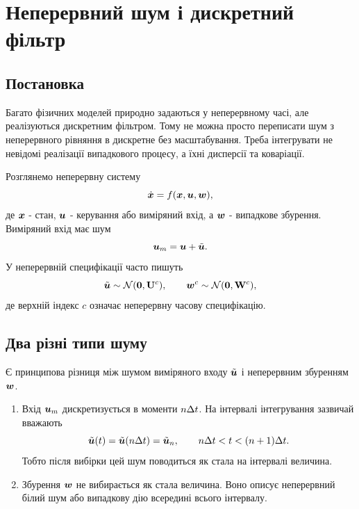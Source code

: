 \chapter{Неперервний шум і дискретний фільтр}


\section{Постановка}

Багато фізичних моделей природно задаються у неперервному часі, але реалізуються дискретним фільтром. Тому не можна просто переписати шум з неперервного рівняння в дискретне без масштабування. Треба інтегрувати не невідомі реалізації випадкового процесу, а їхні дисперсії та коваріації.

Розглянемо неперервну систему
\begin{equation}\label{eq:cont_sys_noise_session02}
\dot{\bm{x}}=f(\bm{x},\bm{u},\bm{w}),
\end{equation}
де $\bm{x}$ - стан, $\bm{u}$ - керування або виміряний вхід, а $\bm{w}$ - випадкове збурення. Виміряний вхід має шум
\begin{equation}
\bm{u}_m=\bm{u}+\tilde{\bm{u}}.
\end{equation}
У неперервній специфікації часто пишуть
\begin{equation}
\tilde{\bm{u}}\sim\mathcal{N}(\bm{0},\mathbf{U}^{c}),
\qquad
\bm{w}^{c}\sim\mathcal{N}(\bm{0},\mathbf{W}^{c}),
\end{equation}
де верхній індекс $c$ означає неперервну часову специфікацію.

\section{Два різні типи шуму}

Є принципова різниця між шумом виміряного входу $\tilde{\bm{u}}$ і неперервним збуренням $\bm{w}$.

\begin{enumerate}[leftmargin=2em]
\item Вхід $\bm{u}_m$ дискретизується в моменти $n\Delta t$. На інтервалі інтегрування зазвичай вважають
\begin{equation}\label{eq:sampled_control_noise}
\tilde{\bm{u}}(t)=\tilde{\bm{u}}(n\Delta t)=\tilde{\bm{u}}_n,
\qquad n\Delta t<t<(n+1)\Delta t.
\end{equation}
Тобто після вибірки цей шум поводиться як стала на інтервалі величина.

\item Збурення $\bm{w}$ не вибирається як стала величина. Воно описує неперервний білий шум або випадкову дію всередині всього інтервалу.
\end{enumerate}

